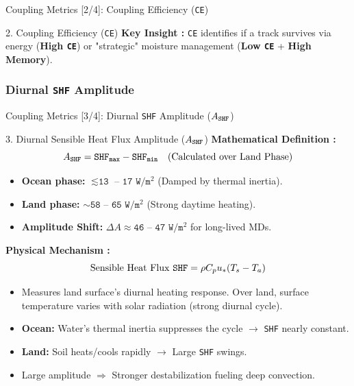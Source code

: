\documentclass[8pt, aspectratio=169]{beamer}
\begin{document}
\begin{frame}{Coupling Metrics [2/4]: Coupling Efficiency (\texttt{CE})}
\begin{block}{2. Coupling Efficiency (\texttt{CE})}
        \vspace{0.2cm}
        \footnotesize
        \textbf{Key Insight :} \texttt{CE} identifies if a track survives via energy (\textbf{High \texttt{CE}}) or "strategic" moisture management (\textbf{Low \texttt{CE}} + \textbf{High Memory}).
    \end{block}
\end{frame}

\subsubsection{Diurnal \texttt{SHF} Amplitude}%
\begin{frame}[label=diurnal]{Coupling Metrics [3/4]: Diurnal \texttt{SHF} Amplitude ($A_{\text{\texttt{SHF}}}$)}
    \footnotesize
    \begin{block}{3. Diurnal Sensible Heat Flux Amplitude ($A_{\text{\texttt{SHF}}}$)}
        \textbf{Mathematical Definition :}
        \begin{equation}
            A_{\text{\texttt{SHF}}} = \text{\texttt{SHF}}_{\text{\texttt{max}}} - \text{\texttt{SHF}}_{\text{\texttt{min}}} \quad \text{(Calculated over Land Phase)}
        \end{equation}

        \begin{itemize}
            \item \textbf{Ocean phase:} $\lesssim \texttt{13}$ -- $\texttt{17 W/m$^2$}$ (Damped by thermal inertia).
            \item \textbf{Land phase:} $\sim \texttt{58}$ -- $\texttt{65 W/m$^2$}$ (Strong daytime heating).
            \item \textbf{Amplitude Shift:} $\Delta A \approx \texttt{46}$ -- $\texttt{47 W/m$^2$}$ for long-lived MDs.
        \end{itemize}
    \end{block}

    \vspace{0.2cm}
    \textbf{Physical Mechanism :}
    \vspace{-0.1cm}
    \[
    \text{Sensible Heat Flux \texttt{SHF}} = \rho C_p u_* (T_s - T_a)
    \]
    \begin{itemize}
        \item Measures land surface's diurnal heating response. Over land, surface temperature varies with solar radiation (strong diurnal cycle).
        \item \textbf{Ocean:} Water's thermal inertia suppresses the cycle $\rightarrow$ \texttt{SHF} nearly constant.
        \item \textbf{Land:} Soil heats/cools rapidly $\rightarrow$ Large \texttt{SHF} swings.
        \item Large amplitude $\Rightarrow$ Stronger destabilization fueling deep convection.
    \end{itemize}


\end{frame}
\end{document}
